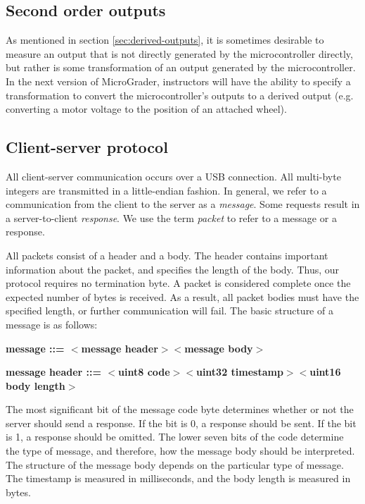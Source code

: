 \documentclass[12pt]{article}
\begin{document}
\subsection{Second order outputs}
As mentioned in section \ref{sec:derived-outputs}, it is sometimes desirable to measure an output that is not directly generated by the microcontroller directly, but rather is some transformation of an output generated by the microcontroller.  In the next version of MicroGrader, instructors will have the ability to specify a transformation to convert the microcontroller's outputs to a derived output (e.g. converting a motor voltage to the position of an attached wheel).

\clearpage
\begin{appendices}
\section{Client-server protocol}
\label{sec:protocol}
All client-server communication occurs over a USB connection.  All multi-byte integers are transmitted in a little-endian fashion.  In general, we refer to a communication from the client to the server as a \textit{message}.  Some requests result in a server-to-client \textit{response}.  We use the term \textit{packet} to refer to a message or a response.

All packets consist of a header and a body.  The header contains important information about the packet, and specifies the length of the body. Thus, our protocol requires no termination byte.  A packet is considered complete once the expected number of bytes is received.  As a result, all packet bodies must have the specified length, or further communication will fail.  The basic structure of a message is as follows:

\textbf{message ::= $<$message header$>$$<$message body$>$}

\textbf{message header ::= $<$uint8 code$>$$<$uint32 timestamp$>$$<$uint16 body length$>$}

\noindent The most significant bit of the message code byte determines whether or not the server should send a response.  If the bit is 0, a response should be sent.  If the bit is 1, a response should be omitted.  The lower seven bits of the code determine the type of message, and therefore, how the message body should be interpreted.  The structure of the message body depends on the particular type of message.  The timestamp is measured in milliseconds, and the body length is measured in bytes.


\end{appendices}
\end{document}
